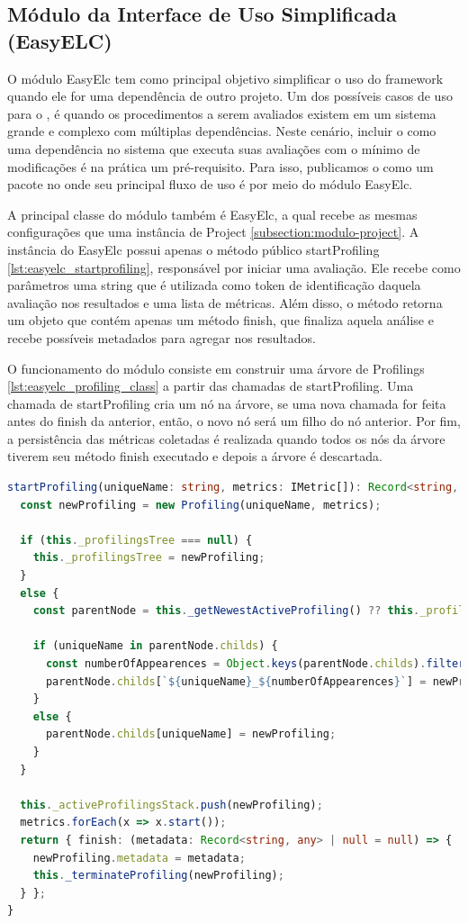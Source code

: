\documentclass[12pt]{tcc}
\begin{document}
	\subsection{Módulo da Interface de Uso Simplificada (EasyELC)}
		\label{subsec:implemencao-easyelc}

	O módulo EasyElc tem como principal objetivo simplificar o uso do framework quando ele for uma dependência de outro projeto.
	Um dos possíveis casos de uso para o , é quando os procedimentos a serem avaliados existem em um sistema grande e complexo com múltiplas dependências.
	Neste cenário, incluir o  como uma dependência no sistema que executa suas avaliações com o mínimo de modificações é na prática um pré-requisito.
	Para isso, publicamos o  como um pacote no  onde seu principal fluxo de uso é por meio do módulo EasyElc.

	A principal classe do módulo também é EasyElc, a qual recebe as mesmas configurações que uma instância de Project \ref{subsection:modulo-project}.
	A instância do EasyElc possui apenas o método público startProfiling \ref{lst:easyelc_startprofiling}, responsável por iniciar uma avaliação.
	Ele recebe como parâmetros uma string que é utilizada como token de identificação daquela avaliação nos resultados e uma lista de métricas.
	Além disso, o método retorna um objeto que contém apenas um método finish, que finaliza aquela análise e recebe possíveis metadados para agregar nos resultados.

	O funcionamento do módulo consiste em construir uma árvore de Profilings \ref{lst:easyelc_profiling_class} a partir das chamadas de startProfiling.
	Uma chamada de startProfiling cria um nó na árvore, se uma nova chamada for feita antes do finish da anterior, então, o novo nó será um filho do nó anterior.
	Por fim, a persistência das métricas coletadas é realizada quando todos os nós da árvore tiverem seu método finish executado e depois a árvore é descartada.

\begin{lstlisting}[label={lst:easyelc_startprofiling}, caption={Implementação do método startProfiling da classe EasyElc.}, language=TypeScript, breaklines=true]
startProfiling(uniqueName: string, metrics: IMetric[]): Record<string, any> {
  const newProfiling = new Profiling(uniqueName, metrics);

  if (this._profilingsTree === null) {
    this._profilingsTree = newProfiling;
  }
  else {
    const parentNode = this._getNewestActiveProfiling() ?? this._profilingsTree;

    if (uniqueName in parentNode.childs) {
      const numberOfAppearences = Object.keys(parentNode.childs).filter(k => k.match(new RegExp(`^${uniqueName}(\$|_[0-9]{1,}\$`))).length
      parentNode.childs[`${uniqueName}_${numberOfAppearences}`] = newProfiling;
    }
    else {
      parentNode.childs[uniqueName] = newProfiling;
    }
  }
  
  this._activeProfilingsStack.push(newProfiling);
  metrics.forEach(x => x.start());
  return { finish: (metadata: Record<string, any> | null = null) => {
    newProfiling.metadata = metadata;
    this._terminateProfiling(newProfiling);
  } };
}
\end{lstlisting}
\end{document}
